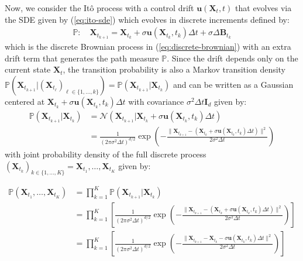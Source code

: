 \documentclass{article}
\begin{document}
Now, we consider the Itô process with a control drift $\boldsymbol{u}(\boldsymbol{X}_t,t)$ that evolves via the SDE given by (\ref{eq:ito-sde}) which evolves in discrete increments defined by:
\begin{align}
    \mathbb{P}: \quad \boldsymbol{X}_{t_{k+1}}=\boldsymbol{X}_{t_k}+\sigma \boldsymbol{u}(\boldsymbol{X}_{t_k},t_k)\Delta t+\sigma\Delta \boldsymbol{B}_{t_k}
\end{align}
which is the discrete Brownian process in (\ref{eq:discrete-brownian}) with an extra drift term that generates the path measure $\mathbb{P}$. Since the drift depends only on the current state $\boldsymbol{X}_t$, the transition probability is also a Markov transition density $\mathbb{P}(\boldsymbol{X}_{t_{k+1}}|(\boldsymbol{X}_{t_\ell})_{\ell\in \{1, \dots,k\}})=\mathbb{P}(\boldsymbol{X}_{t_{k+1}}|\boldsymbol{X}_{t_k})$ and can be written as a Gaussian centered at $\boldsymbol{X}_{t_k}+\sigma \boldsymbol{u}(\boldsymbol{X}_{t_k},t_k)\Delta t$ with covariance $\sigma^2\Delta t\boldsymbol{I}_d$ given by:
\begin{align}
    \mathbb{P}(\boldsymbol{X}_{t_{k+1}}|\boldsymbol{X}_{t_k})&=\mathcal{N}(\boldsymbol{X}_{t_{k+1}}|\boldsymbol{X}_{t_k}+\sigma\boldsymbol{u}(\boldsymbol{X}_{t_k},t_k)\Delta t)\nonumber\\
    &=\frac{1}{(2\pi\sigma^2\Delta t)^{d/2}}\exp\left(-\frac{\|\boldsymbol{X}_{t_{k+1}}-(\boldsymbol{X}_{t_k}+\sigma \boldsymbol{u}(\boldsymbol{X}_{t_k},t_k)\Delta t)\|^2}{2\sigma^2\Delta t}\right)
\end{align}
with joint probability density of the full discrete process $(\boldsymbol{X}_{t_k})_{k\in \{1, \dots, K\}}=\boldsymbol{X}_{t_1}, \dots, \boldsymbol{X}_{t_K}$ given by:
\begin{small}
\begin{align}
    \mathbb{P}(\boldsymbol{X}_{t_1}, \dots, \boldsymbol{X}_{t_K})&=\prod_{k=1}^K \mathbb{P}(\boldsymbol{X}_{t_{k+1}}|\boldsymbol{X}_{t_k})\nonumber\\
    &=\prod_{k=1}^K \left[\frac{1}{(2\pi\sigma^2\Delta t)^{d/2}}\exp\left(-\frac{\|\boldsymbol{X}_{t_{k+1}}-(\boldsymbol{X}_{t_k}+\sigma \boldsymbol{u}(\boldsymbol{X}_{t_k},t_k)\Delta t)\|^2}{2\sigma^2\Delta t}\right)\right]\nonumber\\
    &=\prod_{k=1}^K \left[\frac{1}{(2\pi\sigma^2\Delta t)^{d/2}}\exp\left(-\frac{\|\boldsymbol{X}_{t_{k+1}}-\boldsymbol{X}_{t_k}-\sigma \boldsymbol{u}(\boldsymbol{X}_{t_k},t_k)\Delta t\|^2}{2\sigma^2\Delta t}\right)\right]
\end{align}
\end{small}
\end{document}
